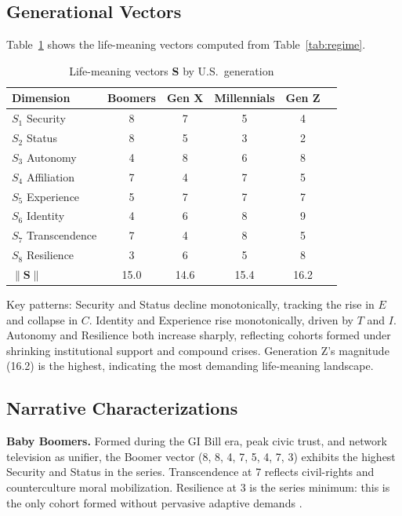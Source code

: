 \documentclass[conference]{IEEEtran}
\begin{document}
\subsection{Generational Vectors}

Table~\ref{tab:vectors} shows the life-meaning vectors computed from Table~\ref{tab:regime}.

\begin{table}[htbp]
\caption{Life-meaning vectors \textbf{S} by U.S.\ generation}
\label{tab:vectors}
\begin{tabular}{lccccc}
\toprule
Dimension & Boomers & Gen X & Millennials & Gen Z \\
\midrule
$S_1$ Security & 8 & 7 & 5 & 4 \\
$S_2$ Status & 8 & 5 & 3 & 2 \\
$S_3$ Autonomy & 4 & 8 & 6 & 8 \\
$S_4$ Affiliation & 7 & 4 & 7 & 5 \\
$S_5$ Experience & 5 & 7 & 7 & 7 \\
$S_6$ Identity & 4 & 6 & 8 & 9 \\
$S_7$ Transcendence & 7 & 4 & 8 & 5 \\
$S_8$ Resilience & 3 & 6 & 5 & 8 \\
$\|\mathbf{S}\|$ & 15.0 & 14.6 & 15.4 & 16.2 \\
\bottomrule
\end{tabular}
\end{table}

Key patterns: Security and Status decline monotonically, tracking the rise in $E$ and collapse in $C$. Identity and Experience rise monotonically, driven by $T$ and $I$. Autonomy and Resilience both increase sharply, reflecting cohorts formed under shrinking institutional support and compound crises. Generation Z's magnitude (16.2) is the highest, indicating the most demanding life-meaning landscape.

\subsection{Narrative Characterizations}

\textbf{Baby Boomers.} Formed during the GI Bill era, peak civic trust, and network television as unifier, the Boomer vector (8, 8, 4, 7, 5, 4, 7, 3) exhibits the highest Security and Status in the series. Transcendence at 7 reflects civil-rights and counterculture moral mobilization. Resilience at 3 is the series minimum: this is the only cohort formed without pervasive adaptive demands \cite{strauss1991,putnam2000}.
\end{document}
